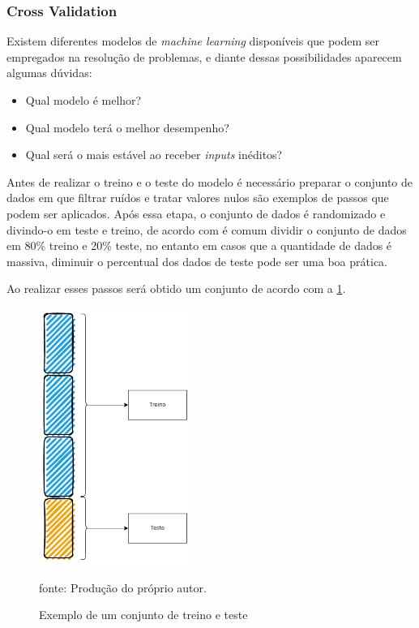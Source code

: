 \documentclass[
  12pt,		%
  a4paper,	%
  openright,%
  oneside,	%
  chapter=TITLE,		%
  section=TITLE,		%
  english,	%
  french,	%
  spanish,	%
  brazil	%
]{abntex2}
\begin{document}
    \subsubsection{Cross Validation}
    Existem diferentes modelos de \textit{machine learning} disponíveis que podem ser empregados na resolução de problemas, 
    e diante dessas possibilidades aparecem algumas dúvidas:

    \begin{itemize}
        \item Qual modelo é melhor?
        \item Qual modelo terá o melhor desempenho?
        \item Qual será o mais estável ao receber \textit{inputs} inéditos?
    \end{itemize}

    Antes de realizar o treino e o teste do modelo é necessário preparar o conjunto de dados em que filtrar ruídos e tratar valores
    nulos são exemplos de passos que podem ser aplicados. Após essa etapa, o conjunto de dados é randomizado
    e divindo-o em teste e treino, de acordo com \cite[]{hands_on_ml} é comum dividir o conjunto de dados em 80\% treino
    e 20\% teste, no entanto em casos que a quantidade de dados é massiva, diminuir o percentual dos dados de teste pode ser
    uma boa prática.

    Ao realizar esses passos será obtido um conjunto de acordo com a \ref*{exemplo_treino_teste}.

    \begin{figure}[h]
        \centering
        \caption{Exemplo de um conjunto de treino e teste}
        \includegraphics[width=5cm]{../reports/figures/treino_teste_exemplo.png}
        \label{exemplo_treino_teste}
        \par
        {\small fonte: Produção do próprio autor.}
    \end{figure}
\end{document}
